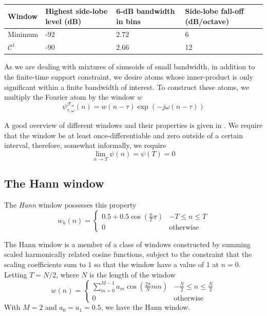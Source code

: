 \begin{table}
    \caption{\label{tab:optvs4termblackman}}
    \begin{center}
        \begin{tabular}{l p{} p{} p{}}
            Window & Highest side-lobe level (dB) & 6-dB bandwidth in bins &
            Side-lobe fall-off (dB/octave) \\
            \hline
            Minimum & -92 & 2.72 & 6 \\
            $\mathcal{C}^{1}$ & -90 & 2.66 & 12 \\
        \end{tabular}
    \end{center}
\end{table}

As we are dealing with mixtures of sinusoids of small bandwidth, in addition to
the finite-time support constraint, we desire atoms whose inner-product is only
significant within a finite bandwidth of interest. To construct these atoms, we
multiply the Fourier atom by the window $w$
\[
    \psi_{\tau,\omega}^{\mathcal{F}_{w}}(n) = w(n-\tau) \exp(-j\omega(n-\tau))
\]

A good overview of different windows and their properties is given in
\cite{harris1978use}. We require that the window be at least
once-differentiable and zero outside of a certain interval, therefore, somewhat
informally, we require
\[
    \lim_{n \rightarrow T} \psi(n) = \psi(T) = 0
\]

\subsection{The Hann window}

The \textit{Hann} window possesses this property
\[
    w_{h}(n) = \begin{cases}
        0.5 + 0.5 \cos \left( \frac{n}{T}\pi \right) & -T \leq n \leq T \\
        0 & \text{otherwise}
    \end{cases}
\]

The Hann window is a member of a class of windows constructed by summing scaled
harmonically related cosine functions, subject to the constraint that the
scaling coefficients sum to 1 so that the window have a value of 1 at $n=0$.
Letting $T=N/2$, where $N$ is the length of the window
\[
    w(n) = \begin{cases}
        \sum_{m=0}^{M-1}a_{m}\cos \left( \frac{2\pi}{N}mn \right) & -\frac{N}{2} \leq n
        \leq \frac{N}{2} \\
        0 & \text{otherwise}
    \end{cases}
\]
With $M=2$ and $a_0 = a_1 = 0.5$, we have the Hann window.

